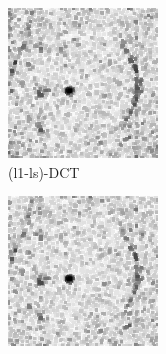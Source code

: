 \documentclass[journal]{IEEEtran}
\begin{document}
\begin{figure}[!h]
\begin{subfigure}[b]{0.24\linewidth}
        \includegraphics[width=\textwidth]{../images/potato/2D/weightsIm_cs_dct30.png}
        \caption{(l1-ls)-DCT}
     \end{subfigure}
    \begin{subfigure}[b]{0.24\linewidth}
        \includegraphics[width=\textwidth]{../images/potato/2D/weightsIm_cs_wavelet30.png}

\end{subfigure}
\end{figure}
\end{document}
